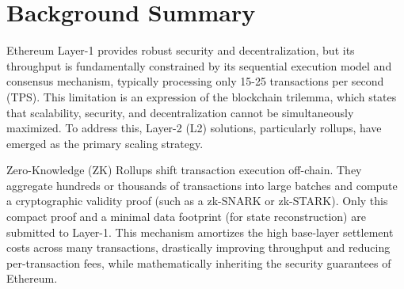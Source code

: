 \section{Background Summary}
\label{sec:background_summary}

Ethereum Layer-1 provides robust security and decentralization, but its throughput is fundamentally constrained by its sequential execution model and consensus mechanism, typically processing only 15-25 transactions per second (TPS). This limitation is an expression of the blockchain trilemma, which states that scalability, security, and decentralization cannot be simultaneously maximized. To address this, Layer-2 (L2) solutions, particularly rollups, have emerged as the primary scaling strategy.

Zero-Knowledge (ZK) Rollups shift transaction execution off-chain. They aggregate hundreds or thousands of transactions into large batches and compute a cryptographic validity proof (such as a zk-SNARK or zk-STARK). Only this compact proof and a minimal data footprint (for state reconstruction) are submitted to Layer-1. This mechanism amortizes the high base-layer settlement costs across many transactions, drastically improving throughput and reducing per-transaction fees, while mathematically inheriting the security guarantees of Ethereum.
